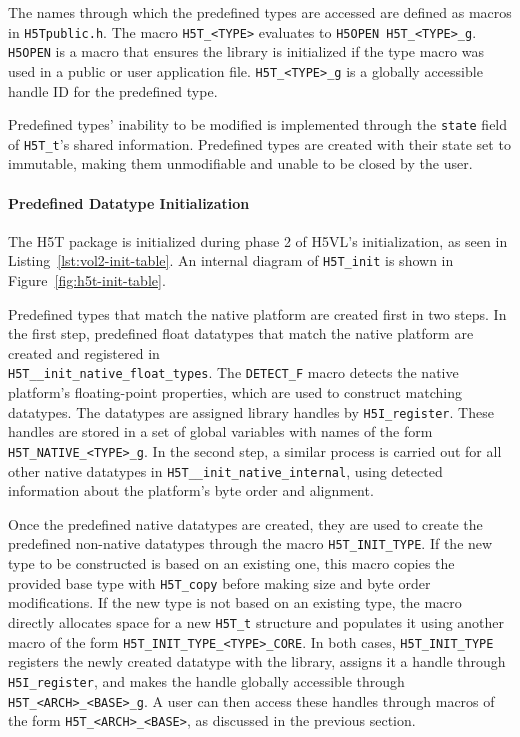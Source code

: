 The names through which the predefined types are accessed are defined as macros in \texttt{H5Tpublic.h}. The macro \texttt{H5T\_<TYPE>} evaluates to \texttt{H5OPEN H5T\_<TYPE>\_g}. \texttt{H5OPEN} is a macro that ensures the library is initialized if the type macro was used in a public or user application file. \texttt{H5T\_<TYPE>\_g} is a globally accessible handle ID for the predefined type.

Predefined types' inability to be modified is implemented through the \texttt{state} field of \texttt{H5T\_t}'s shared information. Predefined types are created with their state set to immutable, making them unmodifiable and unable to be closed by the user.

\paragraph{Predefined Datatype Initialization} The H5T package is initialized during phase 2 of H5VL's initialization, as seen in Listing~\ref{lst:vol2-init-table}. An internal diagram of \texttt{H5T\_init} is shown in Figure~\ref{fig:h5t-init-table}.

Predefined types that match the native platform are created first in two steps. In the first step, predefined float datatypes that match the native platform are created and registered in \\ \texttt{H5T\_\_init\_native\_float\_types}. The \texttt{DETECT\_F} macro detects the native platform's floating-point properties, which are used to construct matching datatypes. The datatypes are assigned library handles by \texttt{H5I\_register}. These handles are stored in a set of global variables with names of the form \texttt{H5T\_NATIVE\_<TYPE>\_g}. In the second step, a similar process is carried out for all other native datatypes in \texttt{H5T\_\_init\_native\_internal}, using detected information about the platform's byte order and alignment.

Once the predefined native datatypes are created, they are used to create the predefined non-native datatypes through the macro \texttt{H5T\_INIT\_TYPE}. If the new type to be constructed is based on an existing one, this macro copies the provided base type with \texttt{H5T\_copy} before making size and byte order modifications. If the new type is not based on an existing type, the macro directly allocates space for a new \texttt{H5T\_t} structure and populates it using another macro of the form \texttt{H5T\_INIT\_TYPE\_<TYPE>\_CORE}. In both cases, \texttt{H5T\_INIT\_TYPE} registers the newly created datatype with the library, assigns it a handle through \texttt{H5I\_register}, and makes the handle globally accessible through \texttt{H5T\_<ARCH>\_<BASE>\_g}. A user can then access these handles through macros of the form \texttt{H5T\_<ARCH>\_<BASE>}, as discussed in the previous section. 

